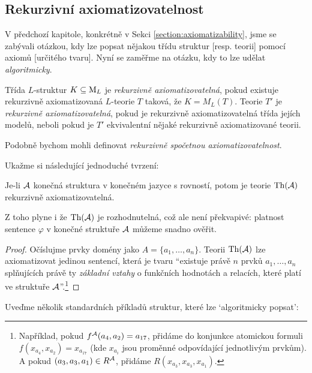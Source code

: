  
\subsection{Rekurzivní axiomatizovatelnost}

V předchozí kapitole, konkrétně v Sekci \ref{section:axiomatizability}, jsme se zabývali otázkou, kdy lze popsat nějakou třídu struktur [resp. teorii] pomocí axiomů [určitého tvaru]. Nyní se zaměřme na otázku, kdy to lze udělat \emph{algoritmicky}.

\begin{definition}
Třída $L$-struktur $K\subseteq\operatorname{M}_L$ je \emph{rekurzivně axiomatizovatelná}, pokud existuje rekurzivně axiomatizovaná $L$-teorie $T$ taková, že $K=M_L(T)$. Teorie $T'$ je \emph{rekurzivně axiomatizovatelná}, pokud je rekurzivně axiomatizovatelná třída jejích modelů, neboli pokud je $T'$ ekvivalentní nějaké rekurzivně axiomatizované teorii.
\end{definition}
\begin{remark}
    Podobně bychom mohli definovat \emph{rekurzivně spočetnou axiomatizovatelnost}.
\end{remark}

Ukažme si následující jednoduché tvrzení:

\begin{proposition}
    Je-li $\mathcal{A}$ konečná struktura v konečném jazyce s rovností, potom je teorie $\operatorname{Th}(\mathcal{A})$ rekurzivně axiomatizovatelná.
\end{proposition}
\begin{remark}
    Z toho plyne i že $\operatorname{Th}(\mathcal{A})$ je rozhodnutelná, což ale není překvapivé: platnost sentence $\varphi$ v konečné struktuře $\mathcal{A}$ můžeme snadno ověřit.
\end{remark}
\begin{proof}
    Očíslujme prvky domény jako $A=\{a_1,\dots,a_n\}$. Teorii $\operatorname{Th}(\mathcal{A})$ lze axiomatizovat jedinou sentencí, která je tvaru ``existuje právě $n$ prvků $a_1,\dots,a_n$ splňujících právě ty \emph{základní vztahy} o funkčních hodnotách a relacích, které platí ve struktuře $\mathcal{A}$''.\footnote{Například, pokud $f^{\mathcal{A}}(a_4, a_2)=a_{17}$, přidáme do konjunkce atomickou formuli $f(x_{a_4},x_{a_2})=x_{a_{17}}$ (kde $x_{a_i}$ jsou proměnné odpovídající jednotlivým prvkům). A pokud $(a_3,a_3,a_1)\in R^{\mathcal{A}}$, přidáme $R(x_{a_3},x_{a_3},x_{a_1})$.}    
\end{proof}
 
Uveďme několik standardních příkladů struktur, které lze `algoritmicky popsat':

